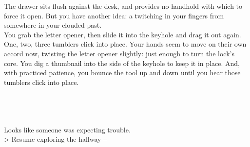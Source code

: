 The drawer sits flush against the desk, and provides no handhold with which to force it open. But you have another idea: a twitching in your fingers from somewhere in your clouded past.\\

You grab the letter opener, then slide it into the keyhole and drag it out again. One, two, three tumblers click into place. Your hands seem to move on their own accord now, twisting the letter opener slightly: just enough to turn the lock's core. You dig a thumbnail into the side of the keyhole to keep it in place. And, with practiced patience, you bounce the tool up and down until you hear those tumblers click into place.\\
\\
\\
\\
\\

Looks like someone was expecting trouble.\\

> Resume exploring the hallway -- 